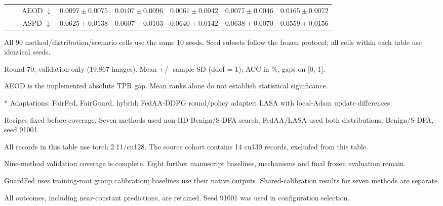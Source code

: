 \begin{table}[t]
{\begin{tabular}{l|l|c|ccccc}
 &  & AEOD $\downarrow$ & $0.0097 \pm 0.0075$ & $0.0107 \pm 0.0096$ & $0.0061 \pm 0.0042$ & $0.0077 \pm 0.0046$ & $0.0165 \pm 0.0072$ \\
 &  & ASPD $\downarrow$ & $0.0625 \pm 0.0138$ & $0.0607 \pm 0.0103$ & $0.0640 \pm 0.0142$ & $0.0638 \pm 0.0070$ & $0.0559 \pm 0.0156$ \\
\hline\hline
\end{tabular}}
\par\smallskip
\begin{minipage}{\textwidth}\scriptsize
All 90 method/distribution/scenario cells use the same 10 seeds. Seed subsets follow the frozen protocol; all cells within each table use identical seeds.\par
Round 70; validation only (19,867 images). Mean +/- sample SD (ddof = 1); ACC in \%, gaps on [0, 1].\par
AEOD is the implemented absolute TPR gap. Mean ranks alone do not establish statistical significance.\par
* Adaptations: FairFed, FairGuard, hybrid; FedAA-DDPG round/policy adapter; LASA with local-Adam update differences.\par
Recipes fixed before coverage. Seven methods used non-IID Benign/S-DFA search; FedAA/LASA used both distributions, Benign/S-DFA, seed 91001.\par
All records in this table use torch 2.11/cu128. The source cohort contains 14 cu130 records, excluded from this table.\par
Nine-method validation coverage is complete. Eight further manuscript baselines, mechanisms and final frozen evaluation remain.\par
GuardFed uses training-root group calibration; baselines use their native outputs. Shared-calibration results for seven methods are separate.\par
All outcomes, including near-constant predictions, are retained. Seed 91001 was used in configuration selection.\par
\end{minipage}
\end{table}
